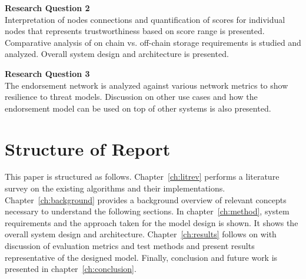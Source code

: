 \textbf{Research Question 2 } \\
Interpretation of nodes connections and quantification of scores for individual
nodes that represents trustworthiness based on score range is presented.
Comparative analysis of on chain vs. off-chain storage requirements is 
studied and analyzed. Overall system design and architecture is presented. 

\textbf{Research Question 3} \\
The endorsement network is analyzed against various network metrics to
show resilience to threat models. Discussion on other use cases and how the
endorsement model can be used on top of other systems is also presented.

%
%


\section{Structure of Report}
This paper is structured as follows. Chapter~\ref{ch:litrev} performs a
literature survey on the existing algorithms and their implementations.
Chapter~\ref{ch:background} provides a background overview of relevant concepts
necessary to understand the following sections. In chapter~\ref{ch:method},
system requirements and the approach taken for the model design is shown. It
shows the overall system design and architecture. Chapter~\ref{ch:results}
follows on with discussion of evaluation metrics and test methods and present
results representative of the designed model. Finally, conclusion and future
work is presented in chapter~\ref{ch:conclusion}. 
